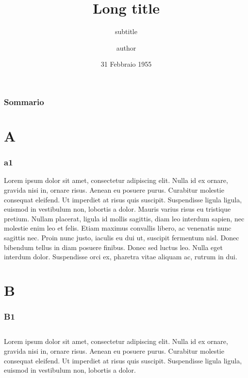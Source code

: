 \documentclass[c]{beamer}
\title[Short title]{Long title}
\subtitle{subtitle}
\author[author]{author}
\date[31/04/1995]{31 Febbraio 1955}
\begin{document}

\polimititlepage
\addtocounter{framenumber}{-1}


\begin{frame}
\frametitle{Sommario}
\tableofcontents
\end{frame}

\section{A}
\begin{frame}
\frametitle{a1}

Lorem ipsum dolor sit amet, consectetur adipiscing elit. Nulla id ex ornare, gravida nisi in, ornare risus. Aenean eu posuere purus. Curabitur molestie consequat eleifend. Ut imperdiet at risus quis suscipit. Suspendisse ligula ligula, euismod in vestibulum non, lobortis a dolor. Mauris varius risus eu tristique pretium. Nullam placerat, ligula id mollis sagittis, diam leo interdum sapien, nec molestie enim leo et felis. Etiam maximus convallis libero, ac venenatis nunc sagittis nec. Proin nunc justo, iaculis eu dui ut, suscipit fermentum nisl. Donec bibendum tellus in diam posuere finibus. Donec sed luctus leo. Nulla eget interdum dolor. Suspendisse orci ex, pharetra vitae aliquam ac, rutrum in dui.

\end{frame}

\section{B}
\begin{frame}
\frametitle{B1}


\begin{columns}[c]
Lorem ipsum dolor sit amet, consectetur adipiscing elit. Nulla id ex ornare, gravida nisi in, ornare risus. Aenean eu posuere purus. Curabitur molestie consequat eleifend. Ut imperdiet at risus quis suscipit. Suspendisse ligula ligula, euismod in vestibulum non, lobortis a dolor. 

\end{columns}

\end{frame}
\end{document}
